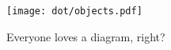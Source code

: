 \begin{figure}[h]
  \begin{center}
    \texttt{[image: dot/objects.pdf]}
    \caption[Analysis Strategy]{Everyone loves a diagram, right?}
  \end{center}
\end{figure}
